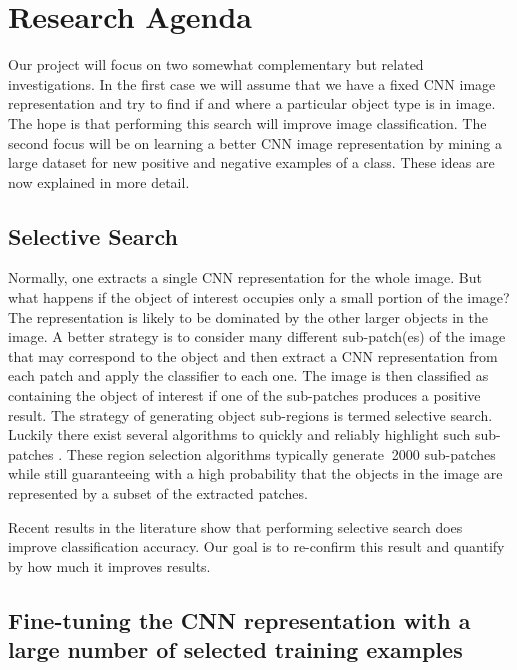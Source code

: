 \documentclass[a4paper]{article}
\begin{document}
\section{Research Agenda}
Our project will focus on two somewhat complementary but related
investigations. In the first case we will assume that we have a fixed
CNN image representation and try to find if and where a particular
object type is in image. The hope is that performing this search will
improve image classification.  The second focus will be on learning a
better CNN image representation by mining a large dataset for new
positive and negative examples of a class. These ideas are now
explained in more detail.

\subsection{Selective Search}
Normally, one extracts a single CNN representation for the whole
image. But what happens if the object of interest occupies only a
small portion of the image? The representation is likely to be
dominated by the other larger objects in the image. A better strategy
is to consider many different sub-patch(es) of the image that may
correspond to the object and then extract a CNN representation from
each patch and apply the classifier to each one. The image is then
classified as containing the object of interest if one of the
sub-patches produces a positive result. The strategy of generating
object sub-regions is termed selective search. Luckily there exist
several algorithms to quickly and reliably highlight such sub-patches
\cite{Sande:iccv:11}. These region selection algorithms typically
generate $~$2000 sub-patches while still guaranteeing with a high
probability that the objects in the image are represented by a subset
of the extracted patches.

Recent results in the literature \cite{Girshick:cvpr:14} show that
performing selective search does improve classification accuracy. Our
goal is to re-confirm this result and quantify by how much it improves
results.

\subsection{Fine-tuning the CNN representation with a large number
    of selected training examples} 
\end{document}
